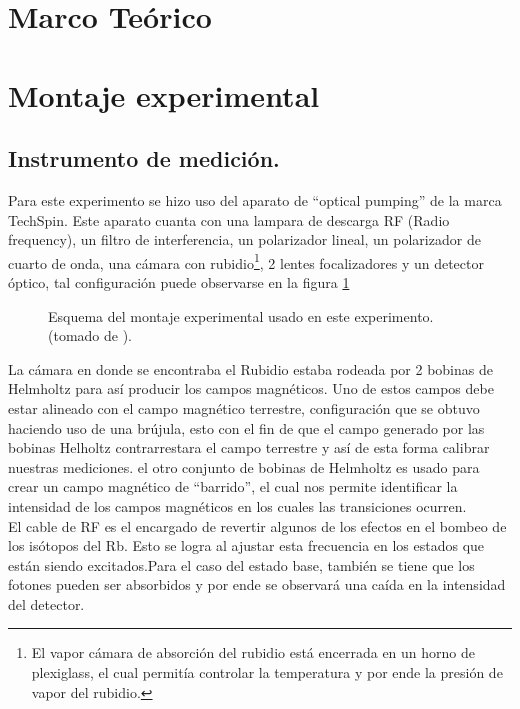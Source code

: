 \documentclass[%
 reprint,
 amsmath,amssymb,
 aps,
]{revtex4-1}
\begin{document}
 \section{Marco Teórico}
 
 
\section{Montaje experimental}
\subsection{Instrumento de medición.}
Para este experimento se hizo uso del aparato de ``optical pumping'' de la marca TechSpin. Este aparato cuanta con una lampara de descarga RF (Radio frequency), un filtro de interferencia, un polarizador lineal, un polarizador de cuarto de onda, una cámara con rubidio\footnote{El vapor cámara de absorción del rubidio está encerrada en un horno de plexiglass, el cual permitía controlar la temperatura y por ende la presión de vapor del rubidio.}, 2 lentes focalizadores y un detector óptico, tal configuración puede observarse en la figura \ref{montaje experimental}
\begin{figure}[h]
\caption{\label{montaje experimental} Esquema del montaje experimental usado en este experimento.  (tomado de \cite{figura_aparato}).}
\end{figure}
La cámara en donde se encontraba el Rubidio estaba rodeada por 2 bobinas de Helmholtz para así producir los campos magnéticos. Uno de estos campos debe estar alineado con el campo magnético terrestre, configuración que se obtuvo haciendo uso de una brújula, esto con el fin de que el campo generado por las bobinas Helholtz contrarrestara el campo terrestre y así de esta forma calibrar nuestras mediciones. el otro conjunto de bobinas de Helmholtz es usado para crear un campo magnético de ``barrido'', el cual nos permite identificar la intensidad de los campos magnéticos en los cuales las transiciones ocurren.\\
El cable de RF es el encargado de revertir algunos de los efectos en el bombeo de los isótopos del Rb. Esto se logra al ajustar esta frecuencia en los estados que están siendo excitados.Para el caso del estado base, también se tiene que los fotones pueden ser absorbidos y por ende se observará una caída en la intensidad del detector.
\end{document}

